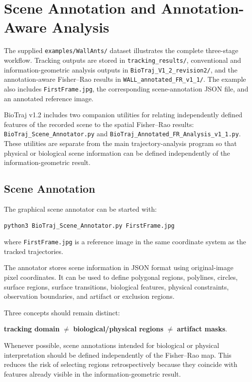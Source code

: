 \documentclass[11pt,a4paper]{article}
\begin{document}
\section{Scene Annotation and Annotation-Aware Analysis}

The supplied \texttt{examples/WallAnts/} dataset illustrates the complete
three-stage workflow. Tracking outputs are stored in
\texttt{tracking\_results/}, conventional and information-geometric analysis
outputs in \texttt{BioTraj\_V1\_2\_revision2/}, and the annotation-aware
Fisher--Rao results in \texttt{WALL\_annotated\_FR\_v1\_1/}. The example also
includes \texttt{FirstFrame.jpg}, the corresponding scene-annotation JSON
file, and an annotated reference image.



BioTraj v1.2 includes two companion utilities for relating independently
defined features of the recorded scene to the spatial Fisher--Rao results:
\texttt{BioTraj\_Scene\_Annotator.py} and
\texttt{BioTraj\_Annotated\_FR\_Analysis\_v1\_1.py}. These utilities are
separate from the main trajectory-analysis program so that physical or
biological scene information can be defined independently of the
information-geometric result.

\subsection{Scene Annotation}

The graphical scene annotator can be started with:
\begin{lstlisting}
python3 BioTraj_Scene_Annotator.py FirstFrame.jpg
\end{lstlisting}
where \texttt{FirstFrame.jpg} is a reference image in the same coordinate
system as the tracked trajectories.

The annotator stores scene information in JSON format using original-image
pixel coordinates. It can be used to define polygonal regions, polylines,
circles, surface regions, surface transitions, biological features, physical
constraints, observation boundaries, and artifact or exclusion regions.

Three concepts should remain distinct:
\begin{center}
\textbf{tracking domain} $\neq$
\textbf{biological/physical regions} $\neq$
\textbf{artifact masks}.
\end{center}

Whenever possible, scene annotations intended for biological or physical
interpretation should be defined independently of the Fisher--Rao map. This
reduces the risk of selecting regions retrospectively because they coincide
with features already visible in the information-geometric result.
\end{document}

